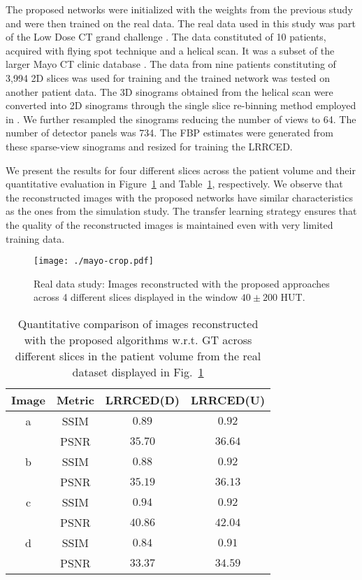 The proposed networks were initialized with the weights from the previous study and were then trained on the real data. The real data used in this study was part of the Low Dose \ac{CT} grand challenge \cite{mccollough2016tu}. The data constituted of 10 patients, acquired with flying spot technique and a helical scan. It was a subset of the larger Mayo \ac{CT} clinic database \cite{moen2021low}. The data from nine patients constituting of 3,994 \ac{2D} slices was used for training and the trained network was tested on another patient data.  The \ac{3D} sinograms obtained from the helical scan were converted into \ac{2D} sinograms through the single slice re-binning method employed in \cite{kim2017low}. We further resampled the sinograms reducing the number of views to 64. The number of detector panels was 734. The \ac{FBP} estimates were generated from these sparse-view sinograms and resized for training the \ac{LRRCED}.

We present the results for four different slices across the patient volume and their quantitative evaluation in Figure~\ref{fig:m1} and Table~\ref{table:m1}, respectively. We observe that the reconstructed images with the proposed networks have similar characteristics as the ones from the simulation study. The transfer learning strategy ensures that the quality of the reconstructed images is maintained even with very limited training data.



\begin{figure}[!t]
	\centering
	\texttt{[image: ./mayo-crop.pdf]}\hfill
	\caption{Real data study: Images reconstructed with the proposed approaches across 4 different slices displayed in the window $40 \pm 200 $ HUT. }\label{fig:m1}
\end{figure}


\begin{table}[ht!]
	\centering
	\caption{Quantitative comparison of images reconstructed with the proposed algorithms w.r.t. \ac{GT} across different slices in the patient volume from the real dataset displayed in Fig.~\ref{fig:m1}}
	\label{table:m1}
	\begin{tabular}{||c|c|c|c||} 
		\hline
		Image & Metric  & LRRCED(D) & LRRCED(U) \\ %
		\hline\hline
		a & SSIM      & $0.89$ & $0.92$ \\ 
		&  PSNR      & $35.70$ & $36.64$  \\   
		\hline  
		b & SSIM      & $0.88$ & $0.92$ \\ 
		& PSNR      & $35.19$ & $36.13$  \\   
		\hline
		c & SSIM      & $0.94$ & $0.92$ \\ 
		& PSNR      & $40.86$ & $42.04$  \\   
		\hline
		d & SSIM      & $0.84$ & $0.91$ \\ 
		& PSNR      & $33.37$ & $34.59$  \\   
		\hline
		
	\end{tabular}
	
\end{table}

